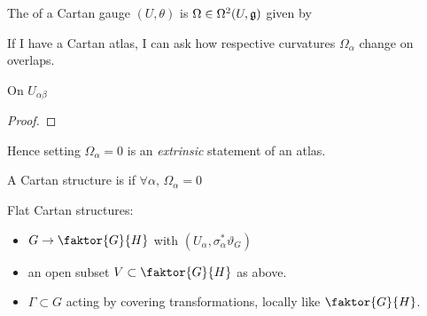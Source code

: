 \documentclass{article}
\begin{document}
\begin{definition}
	The  of a Cartan gauge $(U,\theta)$ is $\Omega \in \Omega^2(U,\mathfrak{g})$ given by 
\end{definition}
If I have a Cartan atlas, I can ask how respective curvatures $\Omega_\alpha$ change on overlaps. 
\begin{lemma}
	On $U_{\alpha\beta}$
\end{lemma}
\begin{proof}
\end{proof}
Hence setting $\Omega_\alpha=0$ is an \emph{extrinsic} statement of an atlas. 

\begin{definition}
	A Cartan structure is  if $\forall \alpha , \, \Omega_\alpha = 0$
\end{definition}

\begin{example}
	Flat Cartan structures: 
	\begin{itemize}
		\item $G \to \faktor{G}{H}$ with $(U_\alpha,\sigma_\alpha^\ast \vartheta_G)$
		\item an open subset $V\subset \faktor{G}{H}$ as above.
		\item $\Gamma \subset G$ acting by covering transformations, locally like $\faktor{G}{H}$. 
	\end{itemize}
\end{example}
\end{document}
